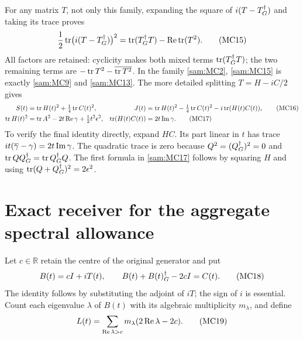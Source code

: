 \documentclass[11pt]{article}
\begin{document}
For any matrix \(T\), not only this family, expanding
the square of \(i(T-T^\dagger_G)\) and taking its trace proves
\begin{equation}
 \frac12\operatorname{tr}\bigl(i(T-T^\dagger_G)\bigr)^2
   =\operatorname{tr}(T^\dagger_G T)-\operatorname{Re}\operatorname{tr}(T^2).
 \tag{MC15}\label{sam:MC15}
\end{equation}
All factors are retained: cyclicity makes both mixed terms
\(\operatorname{tr}(T^\dagger_G T)\); the two remaining terms are
\(-\operatorname{tr} T^2-\overline{\operatorname{tr} T^2}\).
In the family \eqref{sam:MC2}, \eqref{sam:MC15} is exactly
\eqref{sam:MC9} and \eqref{sam:MC13}. The more detailed splitting
\(T=H-iC/2\) gives
\begin{align}
 S(t)&=\operatorname{tr} H(t)^2+\tfrac14\operatorname{tr} C(t)^2,
 & J(t)&=\operatorname{tr} H(t)^2-\tfrac14\operatorname{tr} C(t)^2-i\operatorname{tr}(H(t)C(t)),
 \tag{MC16}\label{sam:MC16}\\
 \operatorname{tr} H(t)^2&=\operatorname{tr} A^2-2t\operatorname{Re}\gamma+\tfrac12t^2\epsilon^2,
 & \operatorname{tr}(H(t)C(t))&=2t\operatorname{Im}\gamma.
 \tag{MC17}\label{sam:MC17}
\end{align}
To verify the final identity directly, expand \(HC\). Its part linear
in \(t\) has trace \(it(\overline\gamma-\gamma)=2t\operatorname{Im}\gamma\).
The quadratic trace is zero because \(Q^2=(Q^\dagger_G)^2=0\) and
\(\operatorname{tr} QQ^\dagger_G=\operatorname{tr} Q^\dagger_G Q\). The first formula in \eqref{sam:MC17}
follows by squaring \(H\) and using
\(\operatorname{tr}(Q+Q^\dagger_G)^2=2\epsilon^2\).

\section{Exact receiver for the aggregate spectral allowance}

Let \(c\in\mathbb R\) retain the centre of the original generator and put
\begin{equation}
 B(t)=cI+iT(t),\qquad
 B(t)+B(t)^\dagger_G-2cI=C(t).
 \tag{MC18}\label{sam:MC18}
\end{equation}
The identity follows by substituting the adjoint of \(iT\);
the sign of \(i\) is essential. Count each eigenvalue \(\lambda\)
of \(B(t)\) with its algebraic multiplicity \(m_\lambda\), and define
\begin{equation}
 L(t)=\sum_{\operatorname{Re}\lambda>c}m_\lambda(2\operatorname{Re}\lambda-2c).
 \tag{MC19}\label{sam:MC19}
\end{equation}
\end{document}
